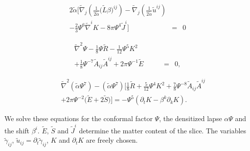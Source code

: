 \documentclass[aps,prd,amsmath,floatfix
,twocolumn
,superscriptaddress,nofootinbib,showpacs]{revtex4-1}
\theoremstyle{plain} \newtheorem{thm}{Theorem} \newtheorem{lem}{Lemma}
\begin{document}
\begin{eqnarray}
2\tilde{\alpha}\bigg[\tilde{\nabla}_j\left(\frac{1}{2\tilde{\alpha}}\big(\tilde{L}\beta\big)^{ij}\right)-\tilde{\nabla}_j\left(\frac{1}{2\tilde{\alpha}}\tilde{u}^{ij}\right) && \nonumber\\
\label{eq:XCTS-Shift}
-\frac{2}{3}\Psi^6\tilde{\nabla}^iK-8\pi\Psi^4\tilde{J}^i\bigg] &=&0
\end{eqnarray}




\begin{eqnarray}
\tilde{\nabla}^2\Psi - \frac{1}{8}\Psi\tilde{R} -
\frac{1}{12}\Psi^5K^2  \qquad\quad && \nonumber \\
\label{eq:XCTS-ConformalFactor}
+\frac{1}{8}\Psi^{-7}\tilde{A}_{ij}\tilde{A}^{ij} +
2\pi\Psi^{-1}\tilde{E} &=& 0,
\end{eqnarray}

\begin{eqnarray}
&&\tilde{\nabla}^2\left(\tilde{\alpha}\Psi^7\right) -
\left(\tilde{\alpha}\Psi^7\right)\bigg[\frac{1}{8}\tilde{R}+\frac{5}{12}\Psi^4K^2+\frac{7}{8}\Psi^{-8}\tilde{A}_{ij}\tilde{A}^{ij}\nonumber \\
\label{eq:XCTS-Lapse}
&&+2\pi\Psi^{-2}\big(\tilde{E}+2\tilde{S}\big)\bigg]=-\Psi^5\left(\partial_{t}K
- \beta^{k}\partial_kK\right).
\end{eqnarray}

We solve these equations for the conformal factor $\Psi$, the
densitized lapse $\alpha\Psi$ and the shift $\beta^i$. $\tilde{E}$,
$\tilde{S}$ and $\tilde{J}^i$ determine the matter content of the
slice. The variables $\tilde{\gamma}_{ij}$, $\tilde{u}_{ij} =
\partial_t\tilde{\gamma}_{ij}$, $K$ and $\partial_t K$ are freely
chosen.
\end{document}
